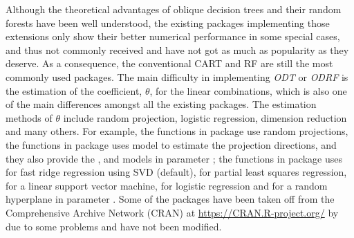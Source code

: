 \documentclass[nojss]{jss}
\newcommand{\fct}[1]{\code{#1()}}
\numberwithin{equation}{section}
\begin{document}
Although the theoretical advantages of oblique decision trees and their random forests have been well understood, the existing packages implementing those extensions only show their better numerical performance in some special cases, and thus not commonly received and have not got as much as popularity as they deserve. As a consequence, the conventional CART and RF are still the most commonly used packages.    The main difficulty in implementing \emph{ODT} or \emph{ODRF} is the estimation of the coefficient, $ \theta $, for the linear combinations, which is also one of the main differences amongst all the existing packages. The estimation methods  of $ \theta $ include random projection, logistic regression, dimension reduction and many others. For example, the functions \fct{RerF} in  package \cite{tomita2020sparse} use random projections, the functions \fct{baggtree} in  package \cite{silva2021projection} uses   model to estimate the projection directions, and they also provide the  ,  and   models in parameter ; the functions \fct{obliqueRF} in  package \cite{menze2011oblique} uses  for fast ridge regression using SVD (default),  for partial least squares regression,  for a linear support vector machine,  for logistic regression and  for a random hyperplane in parameter . %
Some of the  packages have been taken off from the Comprehensive  Archive Network (CRAN) at \url{https://CRAN.R-project.org/} by \citep{R} due to some problems and have not been modified.
\end{document}
